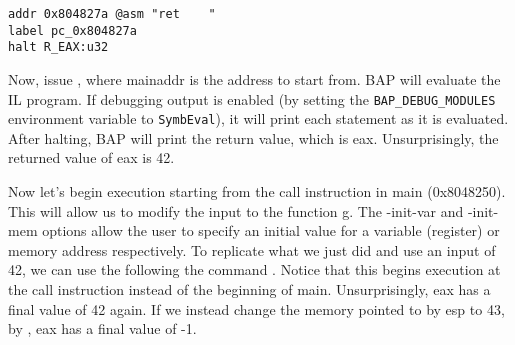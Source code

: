\begin{verbatim}
addr 0x804827a @asm "ret    "
label pc_0x804827a
halt R_EAX:u32
\end{verbatim}

Now, issue , where
mainaddr is the address to start from.  BAP will evaluate the IL
program.  If debugging output is enabled (by setting the
\texttt{BAP\_DEBUG\_MODULES} environment variable to
\texttt{SymbEval}), it will print each statement as it is evaluated.
After halting, BAP will print the return value, which is
eax. Unsurprisingly, the returned value of eax is 42.

Now let's begin execution starting from the call instruction in main
(0x8048250). This will allow us to modify the input to the function
g. The -init-var and -init-mem options allow the user to specify an
initial value for a variable (register) or memory address
respectively.  To replicate what we just did and use an input of 42,
we can use the following the command . Notice that this
begins execution at the call instruction instead of the beginning of
main.  Unsurprisingly, eax has a final value of 42 again.  If we
instead change the memory pointed to by esp to 43, by , eax has
a final value of -1.
